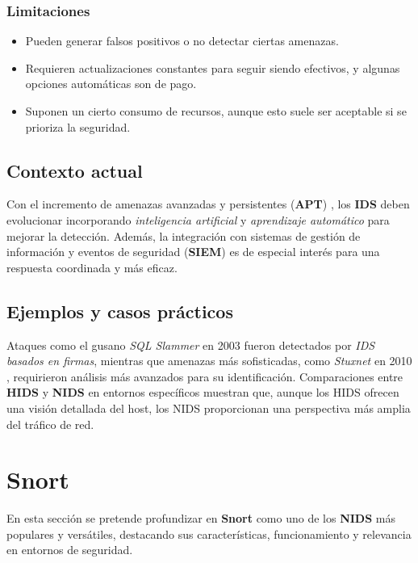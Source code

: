 \documentclass[11pt,a4paper,twoside]{report}
\begin{document}
\subsubsection{Limitaciones}

\begin{itemize}
	\item Pueden generar falsos positivos o no detectar ciertas amenazas.
	\item Requieren actualizaciones constantes para seguir siendo efectivos, y algunas opciones automáticas son de pago.
	\item Suponen un cierto consumo de recursos, aunque esto suele ser aceptable si se prioriza la seguridad.
\end{itemize}



\subsection{Contexto actual}

Con el incremento de amenazas avanzadas y persistentes (\textbf{APT}) \cite{cortes2017amenazas}, los \textbf{IDS} deben evolucionar incorporando \textit{inteligencia artificial} y \textit{aprendizaje automático} para mejorar la detección. Además, la integración con sistemas de gestión de información y eventos de seguridad (\textbf{SIEM}) es de especial interés para una respuesta coordinada y más eficaz.

\subsection{Ejemplos y casos prácticos}

Ataques como el gusano \textit{SQL Slammer} en 2003 \cite{travis2004analysis} fueron detectados por \textit{IDS basados en firmas}, mientras que amenazas más sofisticadas, como \textit{Stuxnet} en 2010 \cite{kerr2010stuxnet} \cite{al2018stuxnet}, requirieron análisis más avanzados para su identificación. Comparaciones entre \textbf{HIDS} y \textbf{NIDS} en entornos específicos muestran que, aunque los HIDS ofrecen una visión detallada del host, los NIDS proporcionan una perspectiva más amplia del tráfico de red.

\section{Snort}

En esta sección se pretende profundizar en \textbf{Snort} como uno de los \textbf{NIDS} más populares y versátiles, destacando sus características, funcionamiento y relevancia en entornos de seguridad.
\end{document}
